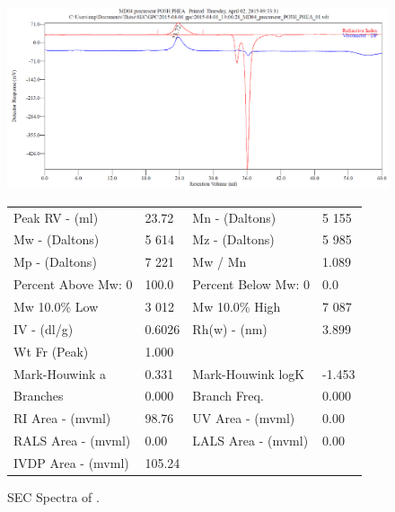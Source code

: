 \documentclass[journal=jacsat,manuscript=article]{achemso}
\begin{document}
\begin{figure}
\includegraphics[width=\textwidth]{sec_spectra.png}
\begin{tabular}{llll}
Peak RV - (ml) & 23.72 & 
Mn - (Daltons) & 5 155 \\
Mw - (Daltons) & 5 614 &
Mz - (Daltons) & 5 985 \\
Mp - (Daltons) & 7 221 &
Mw / Mn & 1.089\\
Percent Above Mw: 0 & 100.0 &
Percent Below Mw: 0 & 0.0\\
Mw 10.0\% Low & 3 012 &
Mw 10.0\% High & 7 087\\
IV - (dl/g) & 0.6026 &
Rh(w) - (nm) & 3.899\\
Wt Fr (Peak) & 1.000 &\\
Mark-Houwink a & 0.331&
Mark-Houwink logK & -1.453\\
Branches & 0.000 &
Branch Freq. & 0.000\\
RI Area - (mvml) & 98.76 &
UV Area - (mvml) & 0.00\\
RALS Area - (mvml) & 0.00 &
LALS Area - (mvml) & 0.00\\
IVDP Area - (mvml) & 105.24\\
\end{tabular}
\caption{SEC Spectra of .}
\label{fig:sec}
\end{figure}
\end{document}
